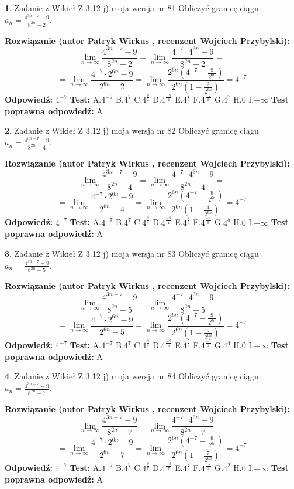 \documentclass[12pt, a4paper]{article}
\theoremstyle{definition} %
\newtheorem{zad}{}
\newcommand{\zadStart}[1]{\begin{zad}#1\newline}
\newcommand{\zadStop}{\end{zad}}
\newcommand{\rozwStart}[2]{\noindent \textbf{Rozwiązanie (autor #1 , recenzent #2): }\newline}
\newcommand{\rozwStop}{\newline}
\newcommand{\odpStart}{\noindent \textbf{Odpowiedź:}\newline}
\newcommand{\odpStop}{\newline}
\newcommand{\testStart}{\noindent \textbf{Test:}\newline}
\newcommand{\testStop}{\newline}
\newcommand{\kluczStart}{\noindent \textbf{Test poprawna odpowiedź:}\newline}
\newcommand{\kluczStop}{\newline}
\begin{document}
\zadStart{Zadanie z Wikieł Z 3.12 j) moja wersja nr 81}
Obliczyć granicę ciągu $a_{n}=\frac{4^{3n-7}-9}{8^{2n}-2}$.
\zadStop
\rozwStart{Patryk Wirkus}{Wojciech Przybylski}
$$\lim\limits_{n\to\infty}\frac{4^{3n-7}-9}{8^{2n}-2}= \lim\limits_{n\to\infty}\frac{4^{-7} \cdot 4^{3n}-9}{8^{2n}-2}=$$
$$= \lim\limits_{n\to\infty}\frac{4^{-7} \cdot 2^{6n}-9}{2^{6n}-2}= \lim\limits_{n\to\infty}\frac{2^{6n}(4^{-7} - \frac{9}{2^{6n}})}{2^{6n}(1-\frac{2}{2^{6n}})}= 4^{-7}$$
\rozwStop
\odpStart
$4^{-7}$
\odpStop
\testStart
A.$4^{-7}$
B.$4^{7}$
C.$4^{\frac{9}{2}}$
D.$4^{\frac{-9}{2}}$
E.$4^{\frac{2}{9}}$
F.$4^{\frac{-2}{9}}$
G.$4^{7}$
H.$0$
I.$-\infty$
\testStop
\kluczStart
A
\kluczStop



\zadStart{Zadanie z Wikieł Z 3.12 j) moja wersja nr 82}
Obliczyć granicę ciągu $a_{n}=\frac{4^{3n-7}-9}{8^{2n}-4}$.
\zadStop
\rozwStart{Patryk Wirkus}{Wojciech Przybylski}
$$\lim\limits_{n\to\infty}\frac{4^{3n-7}-9}{8^{2n}-4}= \lim\limits_{n\to\infty}\frac{4^{-7} \cdot 4^{3n}-9}{8^{2n}-4}=$$
$$= \lim\limits_{n\to\infty}\frac{4^{-7} \cdot 2^{6n}-9}{2^{6n}-4}= \lim\limits_{n\to\infty}\frac{2^{6n}(4^{-7} - \frac{9}{2^{6n}})}{2^{6n}(1-\frac{4}{2^{6n}})}= 4^{-7}$$
\rozwStop
\odpStart
$4^{-7}$
\odpStop
\testStart
A.$4^{-7}$
B.$4^{7}$
C.$4^{\frac{9}{4}}$
D.$4^{\frac{-9}{4}}$
E.$4^{\frac{4}{9}}$
F.$4^{\frac{-4}{9}}$
G.$4^{5}$
H.$0$
I.$-\infty$
\testStop
\kluczStart
A
\kluczStop



\zadStart{Zadanie z Wikieł Z 3.12 j) moja wersja nr 83}
Obliczyć granicę ciągu $a_{n}=\frac{4^{3n-7}-9}{8^{2n}-5}$.
\zadStop
\rozwStart{Patryk Wirkus}{Wojciech Przybylski}
$$\lim\limits_{n\to\infty}\frac{4^{3n-7}-9}{8^{2n}-5}= \lim\limits_{n\to\infty}\frac{4^{-7} \cdot 4^{3n}-9}{8^{2n}-5}=$$
$$= \lim\limits_{n\to\infty}\frac{4^{-7} \cdot 2^{6n}-9}{2^{6n}-5}= \lim\limits_{n\to\infty}\frac{2^{6n}(4^{-7} - \frac{9}{2^{6n}})}{2^{6n}(1-\frac{5}{2^{6n}})}= 4^{-7}$$
\rozwStop
\odpStart
$4^{-7}$
\odpStop
\testStart
A.$4^{-7}$
B.$4^{7}$
C.$4^{\frac{9}{5}}$
D.$4^{\frac{-9}{5}}$
E.$4^{\frac{5}{9}}$
F.$4^{\frac{-5}{9}}$
G.$4^{4}$
H.$0$
I.$-\infty$
\testStop
\kluczStart
A
\kluczStop



\zadStart{Zadanie z Wikieł Z 3.12 j) moja wersja nr 84}
Obliczyć granicę ciągu $a_{n}=\frac{4^{3n-7}-9}{8^{2n}-7}$.
\zadStop
\rozwStart{Patryk Wirkus}{Wojciech Przybylski}
$$\lim\limits_{n\to\infty}\frac{4^{3n-7}-9}{8^{2n}-7}= \lim\limits_{n\to\infty}\frac{4^{-7} \cdot 4^{3n}-9}{8^{2n}-7}=$$
$$= \lim\limits_{n\to\infty}\frac{4^{-7} \cdot 2^{6n}-9}{2^{6n}-7}= \lim\limits_{n\to\infty}\frac{2^{6n}(4^{-7} - \frac{9}{2^{6n}})}{2^{6n}(1-\frac{7}{2^{6n}})}= 4^{-7}$$
\rozwStop
\odpStart
$4^{-7}$
\odpStop
\testStart
A.$4^{-7}$
B.$4^{7}$
C.$4^{\frac{9}{7}}$
D.$4^{\frac{-9}{7}}$
E.$4^{\frac{7}{9}}$
F.$4^{\frac{-7}{9}}$
G.$4^{2}$
H.$0$
I.$-\infty$
\testStop
\kluczStart
A
\kluczStop
\end{document}
